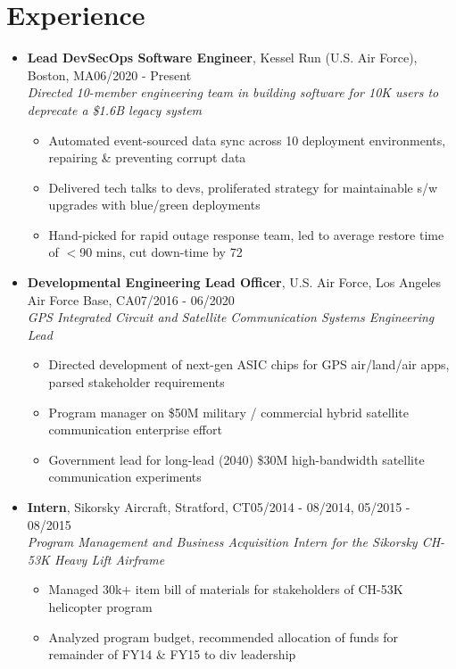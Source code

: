 \documentclass{article}
\begin{document}
\section{Experience} 
\begin{itemize}
    \itemsep0.2em
    \item \textbf{Lead DevSecOps Software Engineer}, Kessel Run (U.S. Air Force), Boston, MA\hfill 06/2020 - Present \\ \emph{Directed 10-member engineering team in building software for 10K users to deprecate a \$1.6B legacy system}
    \vspace{-\topsep} \vspace{0.2em}
    \begin{itemize}
        \itemsep0em
        \item Automated event-sourced data sync across 10 deployment environments, repairing \& preventing corrupt data
        \item Delivered tech talks to devs, proliferated strategy for maintainable s/w upgrades with blue/green deployments
        \item Hand-picked for rapid outage response team, led to average restore time of $<$90 mins, cut down-time by 72%
    \end{itemize}
    
    \item \textbf{Developmental Engineering Lead Officer}, U.S. Air Force, Los Angeles Air Force Base, CA\hfill 07/2016 - 06/2020 \\ \emph{GPS Integrated Circuit and Satellite Communication Systems Engineering Lead}
    \vspace{-\topsep} \vspace{0.2em}
    \begin{itemize}
        \itemsep0em
        \item Directed development of next-gen ASIC chips for GPS air/land/air apps, parsed stakeholder requirements
        \item Program manager on \$50M military / commercial hybrid satellite communication enterprise effort
        \item Government lead for long-lead (2040) \$30M high-bandwidth satellite communication experiments
    \end{itemize}
    
    \item \textbf{Intern}, Sikorsky Aircraft, Stratford, CT\hfill 05/2014 - 08/2014, 05/2015 - 08/2015 \\ \emph{Program Management and Business Acquisition Intern for the Sikorsky CH-53K Heavy Lift Airframe}
    \vspace{-\topsep} \vspace{0.2em}
    \begin{itemize}
        \itemsep0em
        \item Managed 30k+ item bill of materials for stakeholders of CH-53K helicopter program
        \item Analyzed program budget, recommended allocation of funds for remainder of FY14 \& FY15 to div leadership
    \end{itemize} \end{itemize} 
\end{document}
